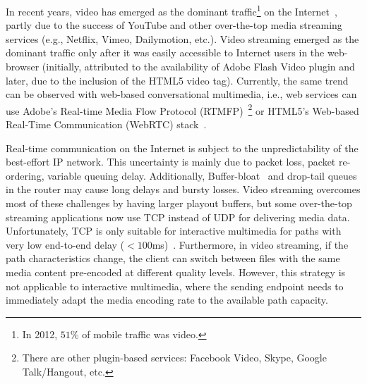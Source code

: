 In recent years, video has emerged as the dominant traffic\footnote{In 2012,
$51\%$ of mobile traffic was video.} on the Internet~\cite{cvni.13,dawn.zb},
partly due to the success of YouTube and other over-the-top media streaming
services (e.g., Netflix, Vimeo, Dailymotion, etc.). Video streaming emerged as
the dominant traffic only after it was easily accessible to Internet users in
the web-browser (initially, attributed to the availability of Adobe Flash
Video plugin and later, due to the inclusion of the HTML5 video tag).
Currently, the same trend can be observed with web-based conversational
multimedia, i.e., web services can use Adobe's Real-time Media Flow Protocol
(RTMFP)~\cite{draft.rtmfp}\footnote{There are other plugin-based services:
Facebook Video, Skype, Google Talk/Hangout, etc.} or HTML5's Web-based
Real-Time Communication (WebRTC) stack~\cite{draft.webrtc}.


Real-time communication on the Internet is subject to the unpredictability of
the best-effort IP network. This uncertainty is mainly due to packet loss,
packet re-ordering, variable queuing delay. Additionally,
Buffer-bloat~\cite{gettys:bufferbloat} and drop-tail queues in the router may
cause long delays and bursty losses. Video streaming overcomes most of these
challenges by having larger playout buffers, but some over-the-top streaming
applications now use TCP instead of UDP for delivering media data.
Unfortunately, TCP is only suitable for interactive multimedia for paths with
very low end-to-end delay ($<100$ms)~\cite{Brosh:tcp-real-time}. Furthermore,
in video streaming, if the path characteristics change, the client can switch
between files with the same media content pre-encoded at different quality
levels. However, this strategy is not applicable to interactive multimedia,
where the sending endpoint needs to immediately adapt the media encoding rate
to the available path capacity.



